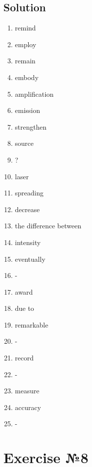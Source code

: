 \subsection*{Solution}
\begin{enumerate}
      \item remind
      \item employ
      \item remain
      \item embody
      \item amplification
      \item emission
      \item strengthen
      \item source
      \item ?
      \item laser
      \item spreading
      \item decrease
      \item the difference between
      \item intensity
      \item eventually
      \item -
      \item award
      \item due to
      \item remarkable
      \item -
      \item record
      \item -
      \item measure
      \item accuracy
      \item -
\end{enumerate}

\section{Exercise №8}
